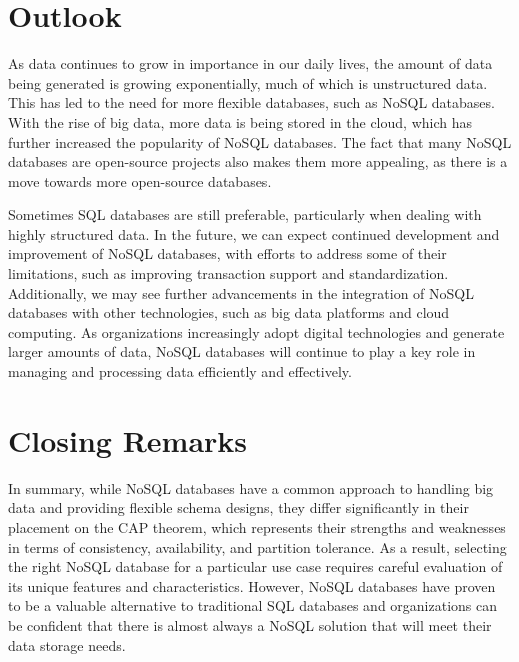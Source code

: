 \section{Outlook}
As data continues to grow in importance in our daily lives, the amount of data being
generated is growing exponentially, much of which is unstructured data. This has led to the
need for more flexible databases, such as NoSQL databases. With the rise of big data, more
data is being stored in the cloud, which has further increased the popularity of NoSQL
databases. The fact that many NoSQL databases are open-source projects also makes them
more appealing, as there is a move towards more open-source databases.

Sometimes SQL databases are still preferable, particularly when dealing with highly
structured data. In the future, we can expect continued development and improvement of
NoSQL databases, with efforts to address some of their limitations, such as improving
transaction support and standardization. Additionally, we may see further advancements in
the integration of NoSQL databases with other technologies, such as big data platforms and
cloud computing. As organizations increasingly adopt digital technologies and generate larger
amounts of data, NoSQL databases will continue to play a key role in managing and
processing data efficiently and effectively.

\section{Closing Remarks}
In summary, while NoSQL databases have a common approach to handling big data and
providing flexible schema designs, they differ significantly in their placement on the CAP
theorem, which represents their strengths and weaknesses in terms of consistency, availability,
and partition tolerance. As a result, selecting the right NoSQL database for a particular use
case requires careful evaluation of its unique features and characteristics. However, NoSQL
databases have proven to be a valuable alternative to traditional SQL databases and
organizations can be confident that there is almost always a NoSQL solution that will meet
their data storage needs.
